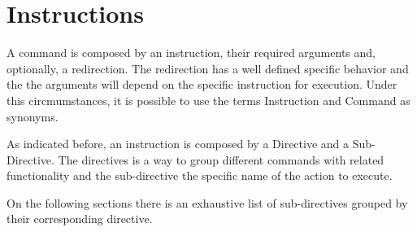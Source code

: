 \chapter{Instructions}
\label{ch:instructions}

A command is composed by an instruction, their required arguments and, optionally, a redirection. The redirection has a well defined specific behavior and the the arguments will depend on the specific instruction for execution. Under this circmumstances, it is possible to use the terms Instruction and Command as synonyms.

As indicated before, an instruction is composed by a Directive and a Sub-Directive. The directives is a way to group different commands with related functionality and the sub-directive the specific name of the action to execute.

On the following sections there is an exhaustive list of sub-directives grouped by their corresponding directive.



\newpage